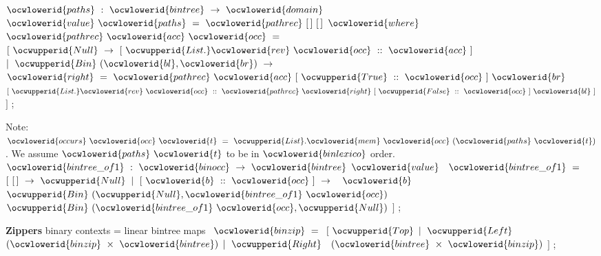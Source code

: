 \documentclass[12pt]{article}
\begin{document}
\ocwendcode{}\ocwindent{0.00em}
\ocwbegindcode{}$\ocwlowerid{paths}~:~\ocwlowerid{bintree}~\rightarrow{}~\ocwlowerid{domain}$\ocwenddcode{} 
\ocweol
\label{../ML/bintree.ml:1345}%
\medskip
\ocwbegincode{}\ocwindent{0.00em}
$\ocwlowerid{value}~\ocwlowerid{paths}~=~\ocwlowerid{pathrec}~[\,]~[\,]$\ocweol
\ocwindent{1.00em}
$\ocwlowerid{where}~$~$\ocwlowerid{pathrec}~\ocwlowerid{acc}~\ocwlowerid{occ}~=~$\ocweol
\ocwindent{1.00em}
$[~\ocwupperid{Null}~\rightarrow{}~[~\ocwupperid{List.}\ocwlowerid{rev}~\ocwlowerid{occ}~::~\ocwlowerid{acc}~]$\ocweol
\ocwindent{1.00em}
$\mid{}~\ocwupperid{Bin}~(\ocwlowerid{bl},\ocwlowerid{br})~\rightarrow{}~$~$\ocwlowerid{right}~=~\ocwlowerid{pathrec}~\ocwlowerid{acc}~[~\ocwupperid{True}~::~\ocwlowerid{occ}~]~\ocwlowerid{br}$\ocweol
\ocwindent{9.50em}
~$[~\ocwupperid{List.}\ocwlowerid{rev}~\ocwlowerid{occ}~::~\ocwlowerid{pathrec}~\ocwlowerid{right}~[~\ocwupperid{False}~::~\ocwlowerid{occ}~]~\ocwlowerid{bl}~]$\ocweol
\ocwindent{1.00em}
$]$\ocweol
\ocwindent{0.00em}
;\medskip

\ocwendcode{}\ocwindent{0.00em}
Note: \ocwbegindcode{}$\ocwlowerid{occurs}~\ocwlowerid{occ}~\ocwlowerid{t}~=~\ocwupperid{List}.\ocwlowerid{mem}~\ocwlowerid{occ}~(\ocwlowerid{paths}~\ocwlowerid{t})$\ocwenddcode{}. We assume \ocwbegindcode{}$\ocwlowerid{paths}~\ocwlowerid{t}$\ocwenddcode{} to be in \ocwbegindcode{}$\ocwlowerid{binlexico}$\ocwenddcode{} order. 
\ocweol
\ocwindent{0.00em}
\ocwbegindcode{}$\ocwlowerid{bintree\_of1}~:~\ocwlowerid{binocc}~\rightarrow{}~\ocwlowerid{bintree}$\ocwenddcode{} 
\ocweol
\label{../ML/bintree.ml:1730}%
\medskip
\ocwbegincode{}\ocwindent{0.00em}
$\ocwlowerid{value}~$~$\ocwlowerid{bintree\_of1}~=~$\ocweol
\ocwindent{1.00em}
$[~[\,]~\rightarrow{}~\ocwupperid{Null}$\ocweol
\ocwindent{1.00em}
$\mid{}~[~\ocwlowerid{b}~::~\ocwlowerid{occ}~]~\rightarrow{}~$~$\ocwlowerid{b}~$~$\ocwupperid{Bin}~(\ocwupperid{Null},\ocwlowerid{bintree\_of1}~\ocwlowerid{occ})$\ocweol
\ocwindent{10.00em}
~$\ocwupperid{Bin}~(\ocwlowerid{bintree\_of1}~\ocwlowerid{occ},\ocwupperid{Null})$\ocweol
\ocwindent{1.00em}
$]$\ocweol
\ocwindent{0.00em}
;\medskip

\ocwendcode{}\ocwindent{0.00em}
{\bf Zippers} 
\ocweol
\ocwindent{0.00em}
binary contexts = linear bintree maps 
\ocweol
\label{../ML/bintree.ml:1954}%
\medskip
\ocwbegincode{}\ocwindent{0.00em}
~$\ocwlowerid{binzip}~=~$\ocweol
\ocwindent{1.00em}
$[~\ocwupperid{Top}$\ocweol
\ocwindent{1.00em}
$\mid{}~\ocwupperid{Left}~$~$(\ocwlowerid{binzip}~\times{}~\ocwlowerid{bintree})$\ocweol
\ocwindent{1.00em}
$\mid{}~\ocwupperid{Right}~$~$(\ocwlowerid{bintree}~\times{}~\ocwlowerid{binzip})$\ocweol
\ocwindent{1.00em}
$]$\ocweol
\ocwindent{0.00em}
;\medskip
\end{document}

